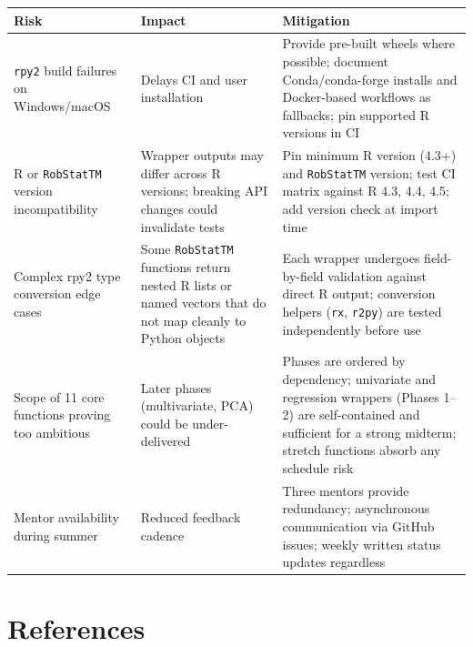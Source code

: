 \documentclass[11pt, a4paper]{article}
\begin{document}
\renewcommand{\arraystretch}{1.3}
\begin{tabularx}{\linewidth}{@{} >{\raggedright\arraybackslash}p{3.5cm}
                                  >{\raggedright\arraybackslash}X
                                  >{\raggedright\arraybackslash}X @{}}
  \toprule
  \textbf{Risk} & \textbf{Impact} & \textbf{Mitigation} \\
  \midrule
  \texttt{rpy2} build failures on Windows/macOS &
  Delays CI and user installation &
  Provide pre-built wheels where possible; document Conda/conda-forge
  installs and Docker-based workflows as fallbacks; pin supported R
  versions in CI \\[4pt]

  R or \texttt{RobStatTM} version incompatibility &
  Wrapper outputs may differ across R versions; breaking API changes
  could invalidate tests &
  Pin minimum R version (4.3+) and \texttt{RobStatTM} version;
  test CI matrix against R 4.3, 4.4, 4.5; add version check at
  import time \\[4pt]

  Complex rpy2 type conversion edge cases &
  Some \texttt{RobStatTM} functions return nested R lists or
  named vectors that do not map cleanly to Python objects &
  Each wrapper undergoes field-by-field validation against direct
  R output; conversion helpers (\texttt{rx}, \texttt{r2py}) are
  tested independently before use \\[4pt]

  Scope of 11 core functions proving too ambitious &
  Later phases (multivariate, PCA) could be under-delivered &
  Phases are ordered by dependency; univariate and regression
  wrappers (Phases 1--2) are self-contained and sufficient for
  a strong midterm; stretch functions absorb any schedule risk \\[4pt]

  Mentor availability during summer &
  Reduced feedback cadence &
  Three mentors provide redundancy; asynchronous communication
  via GitHub issues; weekly written status updates regardless \\
  \bottomrule
\end{tabularx}
\renewcommand{\arraystretch}{1}

\section{References}
\end{document}
